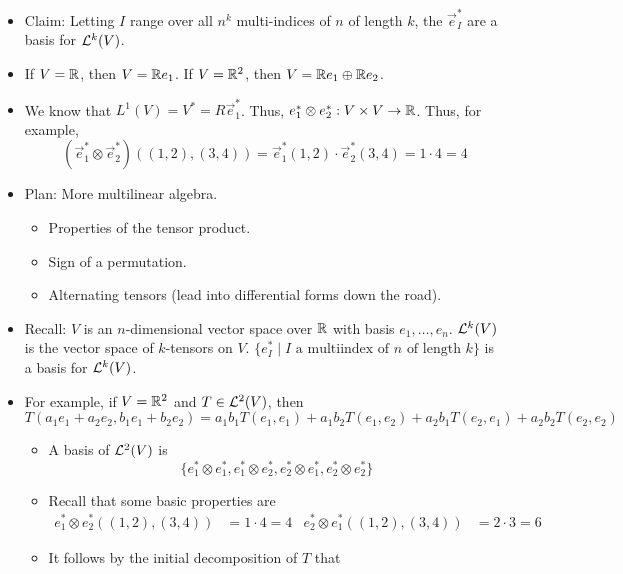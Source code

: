 \documentclass[../notes.tex]{subfiles}
\begin{document}
\begin{itemize}
    \item Claim: Letting $I$ range over all $n^k$ multi-indices of $n$ of length $k$, the $\vec{e}_I^*$ are a basis for $\lin[k]{V}$.
    \item If $V=\R$, then $V=\R\vec{e}_1$. If $V=\R^2$, then $V=\R\vec{e}_1\oplus\R\vec{e}_2$.
    \item We know that $L^1(V)=V^*=R\vec{e}_1^*$. Thus, $\vec{e}_1^*\otimes\vec{e}_2^*:V\times V\to\R$. Thus, for example,
    \begin{equation*}
        (\vec{e}_1^*\otimes\vec{e}_2^*)((1,2),(3,4)) = \vec{e}_1^*(1,2)\cdot \vec{e}_2^*(3,4)
        = 1\cdot 4
        = 4
    \end{equation*}
    \item {}Plan: More multilinear algebra.
    \begin{itemize}
        \item Properties of the tensor product.
        \item Sign of a permutation.
        \item Alternating tensors (lead into differential forms down the road).
    \end{itemize}
    \item Recall: $V$ is an $n$-dimensional vector space over $\R$ with basis $e_1,\dots,e_n$. $\lin[k]{V}$ is the vector space of $k$-tensors on $V$. $\{e_I^*\mid I\text{ a multiindex of }n\text{ of length }k\}$ is a basis for $\lin[k]{V}$.
    \item For example, if $V=\R^2$ and $T\in\lin[2]{V}$, then
    \begin{equation*}
        T(a_1e_1+a_2e_2,b_1e_1+b_2e_2) = a_1b_1T(e_1,e_1)+a_1b_2T(e_1,e_2)+a_2b_1T(e_2,e_1)+a_2b_2T(e_2,e_2)
    \end{equation*}
    \begin{itemize}
        \item A basis of $\lin[2]{V}$ is
        \begin{equation*}
            \{e_1^*\otimes e_1^*,e_1^*\otimes e_2^*,e_2^*\otimes e_1^*,e_2^*\otimes e_2^*\}
        \end{equation*}
        \item Recall that some basic properties are
        \begin{align*}
            e_1^*\otimes e_2^*((1,2),(3,4)) &= 1\cdot 4 = 4&
            e_2^*\otimes e_1^*((1,2),(3,4)) &= 2\cdot 3 = 6
        \end{align*}
        \item It follows by the initial decomposition of $T$ that

\end{itemize}
\end{itemize}
\end{document}

